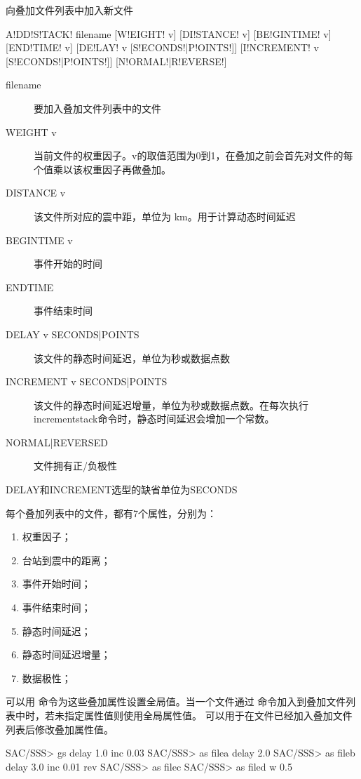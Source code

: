\label{sss:addstack}

向叠加文件列表中加入新文件

\begin{SACSTX}
A!DD!S!TACK! filename [W!EIGHT! v] [DI!STANCE! v] [BE!GINTIME! v] [END!TIME! v]
    [DE!LAY! v [S!ECONDS!|P!OINTS!]] [I!NCREMENT! v [S!ECONDS!|P!OINTS!]]
    [N!ORMAL!|R!EVERSE!]
\end{SACSTX}

\begin{description}
\item [filename] 要加入叠加文件列表中的文件
\item [WEIGHT v] 当前文件的权重因子。v的取值范围为0到1，在叠加之前会首先对文件的每个值乘以该权重因子再做叠加。
\item [DISTANCE v] 该文件所对应的震中距，单位为 \si{\km}。用于计算动态时间延迟
\item [BEGINTIME v] 事件开始的时间
\item [ENDTIME] 事件结束时间
\item [DELAY v SECONDS|POINTS] 该文件的静态时间延迟，单位为秒或数据点数
\item [INCREMENT v SECONDS|POINTS] 该文件的静态时间延迟增量，单位为秒或数据点数。在每次执行incrementstack命令时，静态时间延迟会增加一个常数。
\item [NORMAL|REVERSED] 文件拥有正/负极性
\end{description}

DELAY和INCREMENT选型的缺省单位为SECONDS

每个叠加列表中的文件，都有7个属性，分别为：
\begin{enumerate}
\item 权重因子；
\item 台站到震中的距离；
\item 事件开始时间；
\item 事件结束时间；
\item 静态时间延迟；
\item 静态时间延迟增量；
\item 数据极性；
\end{enumerate}

可以用  命令为这些叠加属性设置全局值。当一个文件通过
  命令加入到叠加文件列表中时，若未指定属性值则使用全局属性值。
  可以用于在文件已经加入叠加文件列表后修改叠加属性值。

\begin{SACCode}
SAC/SSS> gs delay 1.0 inc 0.03
SAC/SSS> as filea delay 2.0
SAC/SSS> as fileb delay 3.0 inc 0.01 rev
SAC/SSS> as filec
SAC/SSS> as filed w 0.5
\end{SACCode}

